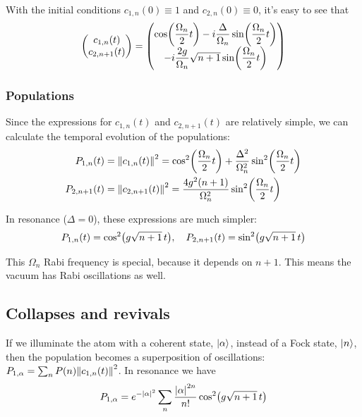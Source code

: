 With the initial conditions $c_{1,n}(0) \equiv 1$ and $c_{2,n}(0) \equiv 0$, it's easy to see that
\begin{align}
	\mqty(c_{1,n}(t) \\ c_{2,n+1}(t)) = \mqty( \cos(\dfrac{\Omega_{n}}{2} t) - i \dfrac{\Delta}{\Omega_{n}} \sin(\dfrac{\Omega_{n}}{2} t) \\ - i \dfrac{2 g}{\Omega_{n}} \sqrt{n+1} \sin(\dfrac{\Omega_{n}}{2} t) )
\end{align}

\subsubsection*{Populations}
Since the expressions for $c_{1,n}(t)$ and $c_{2,n+1}(t)$ are relatively simple, we can calculate the temporal evolution of the populations:
\begin{subequations}
\begin{align}
	P_{1,n} (t) &= \norm{c_{1,n}(t)}^{2} = \cos[2](\frac{\Omega_{n}}{2} t) + \frac{\Delta^{2}}{\Omega_{n}^{2}} \sin[2](\frac{\Omega_{n}}{2} t) \\
	P_{2,n+1} (t) &= \norm{c_{2,n+1}(t)}^{2} = \frac{4 g^{2} (n+1)}{\Omega_{n}^{2}} \sin[2](\frac{\Omega_{n}}{2} t)
\end{align}
\end{subequations}

In resonance ($\Delta = 0$), these expressions are much simpler:
\begin{align}
	P_{1,n} (t) = \cos[2](g \sqrt{n+1} \, t) \qc P_{2,n+1} (t) = \sin[2](g \sqrt{n+1} \, t)
\end{align}

This $\Omega_{n}$ Rabi frequency is special, because it depends on $n+1$. This means the vacuum has Rabi oscillations as well.
\subsection{Collapses and revivals}
If we illuminate the atom with a coherent state, $\ket{\alpha}$, instead of a Fock state, $\ket{n}$, then the population becomes a superposition of oscillations: $P_{1, \alpha} = \sum_{n} P(n) \norm{c_{1,n}(t)}^{2}$. In resonance we have
\begin{align}
	P_{1,\alpha} = e^{-\abs{\alpha}^{2}} \sum_{n} \frac{\abs{\alpha}^{2n}}{n!} \cos[2](g \sqrt{n+1} \, t)
\end{align}

